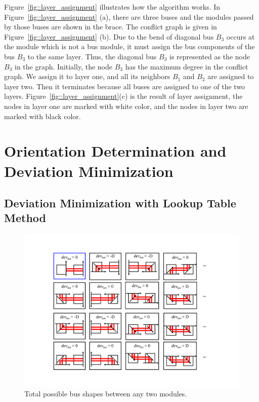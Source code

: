 Figure~\ref{fig::layer_assignment} illustrates how the
algorithm works. In Figure~\ref{fig::layer_assignment}
(a), there are three buses and the modules passed by those
buses are shown in the brace. The conflict graph is given in
Figure~\ref{fig::layer_assignment} (b).
Due to the bend of diagonal bus $B_3$ occurs at the module which is
not a bus module, it must assign the bus components of the bus $B_3$
to the same layer. Thus, the diagonal bus $B_3$ is represented as the node $B_3$ in the graph.
Initially, the node $B_3$ has the maximum degree in the conflict graph.
We assign it to layer one, and all its neighbors $B_1$ and $B_2$ are assigned
to layer two. Then it terminates because all buses are assigned to one of the two layers.
Figure~\ref{fig::layer_assignment}(c) is the result of layer
assignment, the nodes in layer one are marked with white color,
and the nodes in layer two are marked with black color.

\section{Orientation Determination
and Deviation Minimization}
\label{sec::Orientation Determination}
\subsection{Deviation Minimization with Lookup Table Method}
\label{sec::Deviation Minimization with Lookup Table Method}
\begin{figure}[htb]
  \centering
    \includegraphics[width=12cm]{Fig/total_deviation_pattern.pdf}
     \caption{
      Total possible bus shapes between any two modules.
   }
  \label{fig::total_deviation_pattern}
\end{figure}

